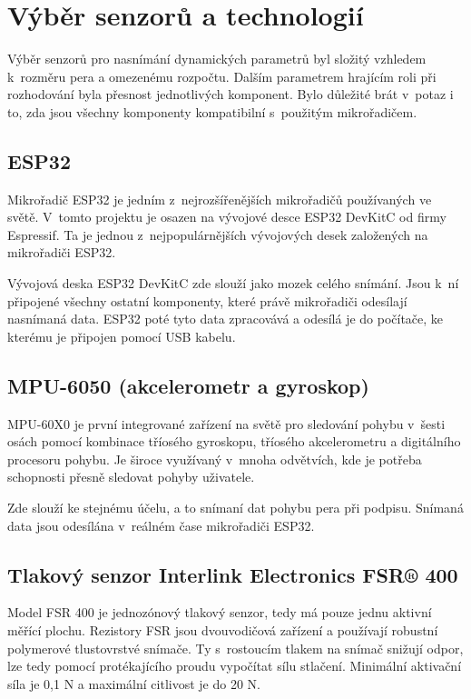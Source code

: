 \section{Výběr senzorů a technologií}
Výběr senzorů pro nasnímání dynamických parametrů byl složitý vzhledem k~rozměru pera a omezenému rozpočtu. %
Dalším parametrem hrajícím roli při rozhodování byla přesnost jednotlivých komponent.                       %
Bylo důležité brát v~potaz i to, zda jsou všechny komponenty kompatibilní s~použitým mikrořadičem.          %

\subsection*{ESP32}
Mikrořadič ESP32 je jedním z~nejrozšířenějších mikrořadičů používaných ve světě.                            %
V~tomto projektu je osazen na vývojové desce ESP32 DevKitC od firmy Espressif.                              %
Ta je jednou z~nejpopulárnějších vývojových desek založených na mikrořadiči ESP32.~\cite{Kolban2017}        %

Vývojová deska ESP32 DevKitC zde slouží jako mozek celého snímání.                                          %
Jsou k~ní připojené všechny ostatní komponenty, které právě mikrořadiči odesílají nasnímaná data.           %
ESP32 poté tyto data zpracovává a odesílá je do počítače, ke kterému je připojen  pomocí USB kabelu.        %

\subsection*{MPU-6050 (akcelerometr a gyroskop)}
MPU-60X0 je první integrované zařízení na světě pro sledování pohybu v~šesti osách pomocí           %
kombinace tříosého gyroskopu, tříosého akcelerometru a digitálního procesoru pohybu.                %
Je široce využívaný v~mnoha odvětvích, kde je potřeba schopnosti přesně sledovat pohyby uživatele.~\cite{InvenSense2015}%

Zde slouží ke stejnému účelu, a to snímaní dat pohybu pera při podpisu.                             %
Snímaná data jsou odesílána v~reálném čase mikrořadiči ESP32.                                       %

\subsection*{Tlakový senzor Interlink Electronics FSR® 400}
Model FSR 400 je jednozónový tlakový senzor, tedy má pouze jednu aktivní měřící plochu.                       %
Rezistory FSR jsou dvouvodičová zařízení a používají robustní polymerové tlustovrstvé snímače.                %
Ty s~rostoucím tlakem na snímač snižují odpor, lze tedy pomocí protékajícího proudu vypočítat sílu stlačení.  %
Minimální aktivační síla je 0,1 N a maximální citlivost je do 20 N.~\cite{InterlinkElectronicsFSR400}         %


